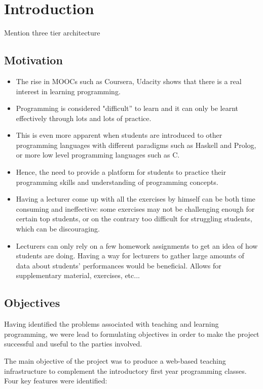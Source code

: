 \documentclass[11pt,a4paper]{report}
\begin{document}
\chapter{Introduction}
Mention three tier architecture

\section{Motivation}

\begin{itemize}
\item The rise in MOOCs such as Coursera, Udacity shows that there is a real interest in learning programming.
\item Programming is considered "difficult'' to learn and it can only be learnt effectively through lots and lots of practice.
\item This is even more apparent when students are introduced to other programming languages with different paradigms such as Haskell and Prolog, or more low level programming languages such as C.
\item Hence, the need to provide a platform for students to practice their programming skills and understanding of programming concepts.
\item Having a lecturer come up with all the exercises by himself can be both time consuming and ineffective: some exercises may not be challenging enough for certain top students, or on the contrary too difficult for struggling students, which can be discouraging.
\item Lecturers can only rely on a few homework assignments to get an idea of how students are doing. Having a way for lecturers to gather large amounts of data about students' performances would be beneficial. Allows for supplementary material, exercises, etc...
\end{itemize}

\section{Objectives}
Having identified the problems associated with teaching and learning programming, we were lead to formulating objectives in order to make the project successful and useful to the parties involved. \newline

The main objective of the project was to produce a web-based teaching infrastructure to complement the introductory first year programming classes. Four key features were identified:
\end{document}
